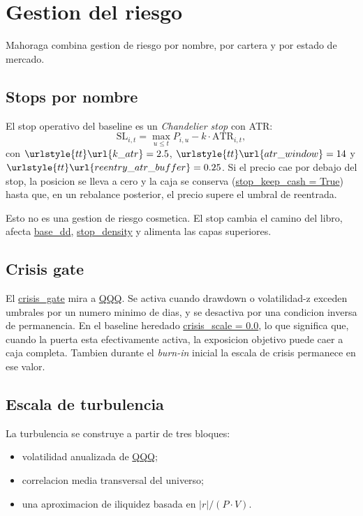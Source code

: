 \documentclass[11pt,letterpaper]{article}
\newcommand{\code}[1]{{\urlstyle{tt}\url{#1}}}
\begin{document}
\section{Gestion del riesgo}
Mahoraga combina gestion de riesgo por nombre, por cartera y por estado de mercado.

\subsection{Stops por nombre}
El stop operativo del baseline es un \emph{Chandelier stop} con ATR:
\begin{equation}
\mathrm{SL}_{i,t} = \max_{u \le t} P_{i,u} - k \cdot \mathrm{ATR}_{i,t},
\end{equation}
con \(\code{k\_atr} = 2.5\), \(\code{atr\_window} = 14\) y \(\code{reentry\_atr\_buffer} = 0.25\). Si el precio cae por debajo del stop, la posicion se lleva a cero y la caja se conserva (\code{stop\_keep\_cash = True}) hasta que, en un rebalance posterior, el precio supere el umbral de reentrada.

Esto no es una gestion de riesgo cosmetica. El stop cambia el camino del libro, afecta \code{base\_dd}, \code{stop\_density} y alimenta las capas superiores.

\subsection{Crisis gate}
El \code{crisis\_gate} mira a \code{QQQ}. Se activa cuando drawdown o volatilidad-z exceden umbrales por un numero minimo de dias, y se desactiva por una condicion inversa de permanencia. En el baseline heredado \code{crisis\_scale = 0.0}, lo que significa que, cuando la puerta esta efectivamente activa, la exposicion objetivo puede caer a caja completa. Tambien durante el \emph{burn-in} inicial la escala de crisis permanece en ese valor.

\subsection{Escala de turbulencia}
La turbulencia se construye a partir de tres bloques:
\begin{itemize}
    \item volatilidad anualizada de \code{QQQ};
    \item correlacion media transversal del universo;
    \item una aproximacion de iliquidez basada en \(|r|/(P \cdot V)\).
\end{itemize}
\end{document}
